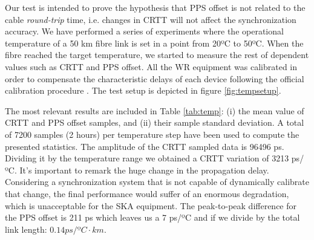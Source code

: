 Our test is intended to prove the hypothesis that PPS offset is not related to 
the cable \textit{round-trip} time, i.e. changes in CRTT will not affect the 
synchronization accuracy. We have performed a series of experiments where the 
operational temperature of a 50 km fibre link is set in a point from 20ºC to 
50ºC. When the fibre reached the target temperature, we started to measure the 
rest of dependent values such as CRTT and PPS offset. All the WR equipment was 
calibrated in order to compensate the characteristic delays of each device 
following the official calibration procedure \cite{man:calib}.  The test setup 
is depicted in figure \ref{fig:tempsetup}.

The most relevant results are included in Table \ref{tab:temp}: (i) the mean 
value of CRTT and PPS offset samples, and (ii) their sample standard deviation. 
A total of 7200 samples (2 hours) per temperature step have been used to 
compute the presented statistics. The amplitude of the CRTT sampled data is 
96496 ps. Dividing it by the temperature range we obtained a CRTT variation of 
3213 ps/ºC. It's important to remark the huge change in the propagation delay. 
Considering a synchronization system that is not capable of dynamically 
calibrate that change, the final performance would suffer of an enormous 
degradation, which is unacceptable for the SKA equipment. The peak-to-peak 
difference for the PPS offset is 211 ps which leaves us a 7 ps/ºC and if we 
divide by the total link length: $0.14 ps/ºC \cdot km$.


